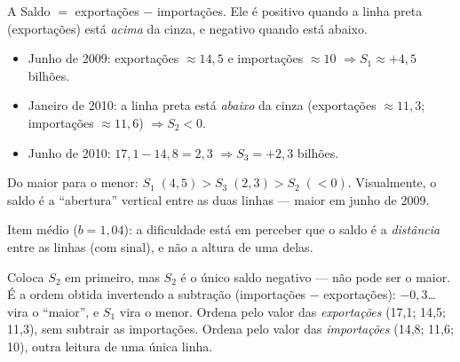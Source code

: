 \begin{resolucao}{A}
 Saldo $=$ exportações $-$ importações. Ele é positivo quando a linha preta (exportações) está \emph{acima} da cinza, e negativo quando está abaixo.

\begin{itemize}[nosep]
\item Junho de 2009: exportações $\approx14{,}5$ e importações $\approx10$ $\Rightarrow S_1\approx+4{,}5$ bilhões.
\item Janeiro de 2010: a linha preta está \emph{abaixo} da cinza (exportações $\approx11{,}3$; importações $\approx11{,}6$) $\Rightarrow S_2<0$.
\item Junho de 2010: $17{,}1-14{,}8=2{,}3$ $\Rightarrow S_3=+2{,}3$ bilhões.
\end{itemize}

 Do maior para o menor: $S_1\;(4{,}5)>S_3\;(2{,}3)>S_2\;(<0)$. Visualmente, o saldo é a “abertura” vertical entre as duas linhas — maior em junho de 2009.


Item médio ($b=1{,}04$): a dificuldade está em perceber que o saldo é a \emph{distância} entre as linhas (com sinal), e não a altura de uma delas.
\begin{distratores}
 Coloca $S_2$ em primeiro, mas $S_2$ é o único saldo negativo — não pode ser o maior.
 É a ordem obtida invertendo a subtração (importações $-$ exportações): $-0{,}3$… vira o “maior”, e $S_1$ vira o menor.
 Ordena pelo valor das \emph{exportações} (17,1; 14,5; 11,3), sem subtrair as importações.
 Ordena pelo valor das \emph{importações} (14,8; 11,6; 10), outra leitura de uma única linha.
\end{distratores}
\end{resolucao}

